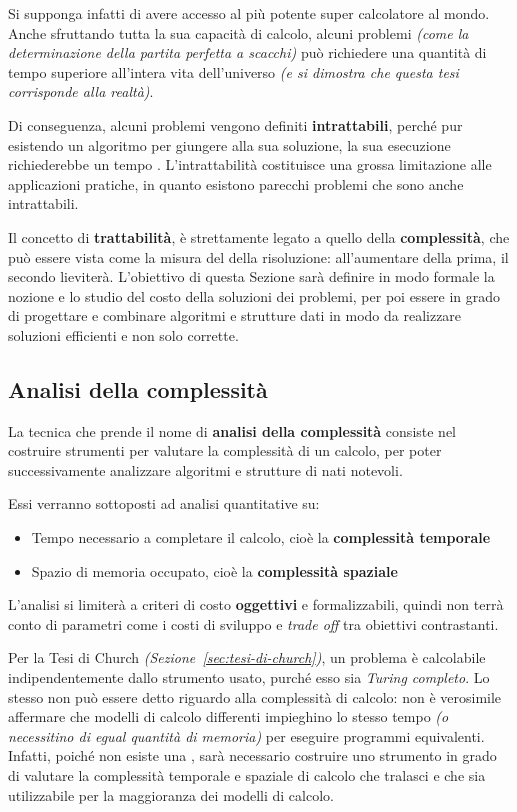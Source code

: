 \documentclass[italian, 10pt]{article}
\begin{document}
Si supponga infatti di avere accesso al più potente super calcolatore al mondo.
Anche sfruttando tutta la sua capacità di calcolo, alcuni problemi \textit{(come la determinazione della partita perfetta a scacchi)} può richiedere una quantità di tempo superiore all'intera vita dell'universo \textit{(e si dimostra che questa tesi corrisponde alla realtà)}.

Di conseguenza, alcuni problemi vengono definiti \textbf{intrattabili}, perché pur esistendo un algoritmo per giungere alla sua soluzione, la sua esecuzione richiederebbe un tempo .
L'intrattabilità costituisce una grossa limitazione alle applicazioni pratiche, in quanto esistono parecchi problemi  che sono anche intrattabili.

Il concetto di \textbf{trattabilità}, è strettamente legato a quello della \textbf{complessità}, che può essere vista come la misura del  della risoluzione: all'aumentare della prima, il secondo lieviterà.
L'obiettivo di questa Sezione sarà definire in modo formale la nozione e lo studio del costo della soluzioni dei problemi, per poi essere in grado di progettare e combinare algoritmi e strutture dati in modo da realizzare soluzioni efficienti e non solo corrette.

\subsection{Analisi della complessità}

La tecnica che prende il nome di \textbf{analisi della complessità} consiste nel costruire strumenti per valutare la complessità di un calcolo, per poter successivamente analizzare algoritmi e strutture di nati notevoli.

Essi verranno sottoposti ad analisi quantitative su:

\begin{itemize}
  \item Tempo necessario a completare il calcolo, cioè la \textbf{complessit\`a temporale}
  \item Spazio di memoria occupato, cioè la \textbf{complessità spaziale}
\end{itemize}

L'analisi si limiterà a criteri di costo \textbf{oggettivi} e formalizzabili, quindi non terrà conto di parametri come i costi di sviluppo e \textit{trade off} tra obiettivi contrastanti.

\bigskip
Per la Tesi di Church \textit{(Sezione~\ref{sec:tesi-di-church})}, un problema è calcolabile indipendentemente dallo strumento usato, purché esso sia \textit{Turing completo}.
Lo stesso non può essere detto riguardo alla complessità di calcolo: non è verosimile affermare che modelli di calcolo differenti impieghino lo stesso tempo \textit{(o necessitino di egual quantità di memoria)} per eseguire programmi equivalenti.
Infatti, poiché non esiste una , sarà necessario costruire uno strumento in grado di valutare la complessità temporale e spaziale di calcolo che tralasci  e che sia utilizzabile per la maggioranza dei modelli di calcolo.
\end{document}
